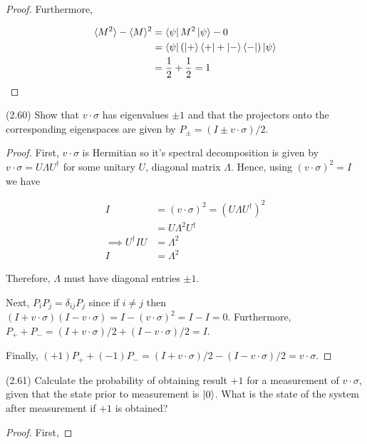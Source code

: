 \documentclass[main.tex]{subfiles}
\begin{document}
\begin{subappendices}
\begin{exercise}
\begin{proof}
	Furthermore,

	\begin{align*}
	\langle M^2 \rangle - \langle M \rangle^2 &= \bra{\psi} M^2 	\ket{\psi} - 0 \\
	&= \bra{\psi} (\ket{+}\bra{+} + \ket{-}\bra{-}) \ket{\psi} \\
	&= \frac{1}{2} + \frac{1}{2} = 1
	\end{align*}
	\end{proof}
	
\end{exercise}

\begin{exercise}
	(2.60) Show that $v \cdot \sigma$ has eigenvalues $\pm 1$ and that the projectors onto the corresponding eigenspaces are given by $P_{\pm} = (I \pm v \cdot \sigma)/2$.

\begin{proof}
	First, $v\cdot \sigma$ is Hermitian so it's spectral decomposition is given by $v \cdot \sigma = U \Lambda U^\dag$ for some unitary $U$, diagonal matrix $\Lambda$. Hence, using $(v\cdot \sigma)^2 = I$ we have
	
	\begin{align*}
		I &= (v \cdot \sigma)^2 = (U \Lambda U^\dag)^2 \\
		&= U \Lambda^2 U^\dag \\
		\implies U^\dag I U &= \Lambda^2 \\
		I & = \Lambda^2
	\end{align*}

Therefore, $\Lambda$ must have diagonal entries $\pm 1$. 

Next, $P_i P_j = \delta_{ij}P_j$ since if $i \neq j$ then $(I + v \cdot \sigma)(I - v\cdot \sigma) = I - (v \cdot \sigma)^2 = I - I = 0$. Furthermore, $P_+ + P_- = (I + v \cdot \sigma)/2 + (I - v \cdot \sigma)/2 = I$. 

Finally, $(+1)P_+ + (-1)P_- = (I + v \cdot \sigma)/2 - (I - v \cdot \sigma)/2 = v \cdot \sigma$. 
\end{proof}
\end{exercise}

\begin{exercise}
	(2.61) Calculate the probability of obtaining result $+1$ for a measurement of $v \cdot \sigma$, given that the state prior to measurement is $\ket{0}$. What is the state of the system after measurement if $+1$ is obtained?
	
	\begin{proof}
	
	First, 
	

\end{proof}
\end{exercise}
\end{subappendices}
\end{document}
